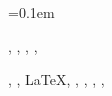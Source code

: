 

\begin{description}[leftmargin=!,labelindent=\parindent,labelwidth=\widthof{\bfseries LanguagesX}]
        \parskip=0.1em

    \item[Languages]


        \bash,
        \CPP,
        \Fortran,
        \Python,

    \item[Tools]
        \BeautifulSoup,
        \git,
        \LaTeX, 
        \Linux,
        \matplotlib,
        \MPI,
        \Numpy,
        \OpenMP

\end{description}

